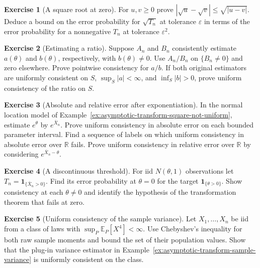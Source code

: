 \documentclass[11pt,oneside]{book}
\theoremstyle{definition}
\newtheorem{exercise}{Exercise}[section]
\theoremstyle{remark}
\newcommand{\R}{\mathbb R}
\begin{document}
\begin{exercise}[A square root at zero]
\label{exer:asymptotic-transform-square-root}
For $u,v\geq0$ prove $|\sqrt u-\sqrt v|\leq\sqrt{|u-v|}$.
Deduce a bound on the error probability for $\sqrt{T_n}$ at
tolerance $\varepsilon$ in terms of the error probability
for a nonnegative $T_n$ at tolerance $\varepsilon^2$.
\end{exercise}

\begin{exercise}[Estimating a ratio]
\label{exer:asymptotic-transform-ratio}
Suppose $A_n$ and $B_n$ consistently estimate $a(\theta)$
and $b(\theta)$, respectively, with $b(\theta)\ne0$.
Use $A_n/B_n$ on $\{B_n\ne0\}$ and zero elsewhere.
Prove pointwise consistency for $a/b$. If both original
estimators are uniformly consistent on $S$, $\sup_S|a|<\infty$,
and $\inf_S|b|>0$, prove uniform consistency of the ratio on $S$.
\end{exercise}

\begin{exercise}[Absolute and relative error after exponentiation]
\label{exer:asymptotic-transform-exponential}
In the normal location model of
Example~\ref{ex:asymptotic-transform-square-not-uniform},
estimate $e^\theta$ by $e^{\bar X_n}$. Prove uniform consistency
in absolute error on each bounded parameter interval. Find a
sequence of labels on which uniform consistency in absolute
error over $\R$ fails. Prove uniform consistency in relative
error over $\R$ by considering $e^{\bar X_n-\theta}$.
\end{exercise}

\begin{exercise}[A discontinuous threshold]
\label{exer:asymptotic-transform-normal-threshold}
For iid $N(\theta,1)$ observations let
$T_n=\mathbf 1_{\{\bar X_n>0\}}$. Find its error probability
at $\theta=0$ for the target $\mathbf 1_{\{\theta>0\}}$.
Show consistency at each $\theta\ne0$ and identify the
hypothesis of the transformation theorem that fails at zero.
\end{exercise}

\begin{exercise}[Uniform consistency of the sample variance]
\label{exer:asymptotic-transform-variance-uniform}
Let $X_1,\ldots,X_n$ be iid from a class of laws with
$\sup_P\mathbb E_P[X^4]<\infty$. Use Chebyshev's inequality
for both raw sample moments and bound the set of their
population values. Show that the plug-in variance estimator
in Example~\ref{ex:asymptotic-transform-sample-variance}
is uniformly consistent on the class.
\end{exercise}
\end{document}
